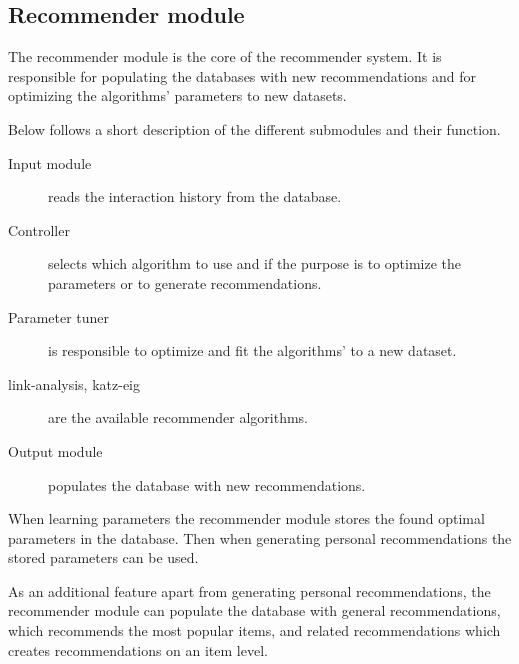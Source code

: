 
\subsection{Recommender module}

The recommender module is the core of the recommender system. It is responsible for populating the databases with new recommendations and for optimizing the algorithms' parameters to new datasets.

Below follows a short description of the different submodules and their function.

\begin{description}
    \item[Input module] reads the interaction history from the database.
    \item[Controller] selects which algorithm to use and if the purpose is to optimize the parameters or to generate recommendations.
    \item[Parameter tuner] is responsible to optimize and fit the algorithms' to a new dataset.
    \item[link-analysis, katz-eig] are the available recommender algorithms.
    \item[Output module] populates the database with new recommendations.
\end{description}

When learning parameters the recommender module stores the found optimal parameters in the database. Then when generating personal recommendations the stored parameters can be used.

As an additional feature apart from generating personal recommendations, the recommender module can populate the database with general recommendations, which recommends the most popular items, and related recommendations which creates recommendations on an item level.

